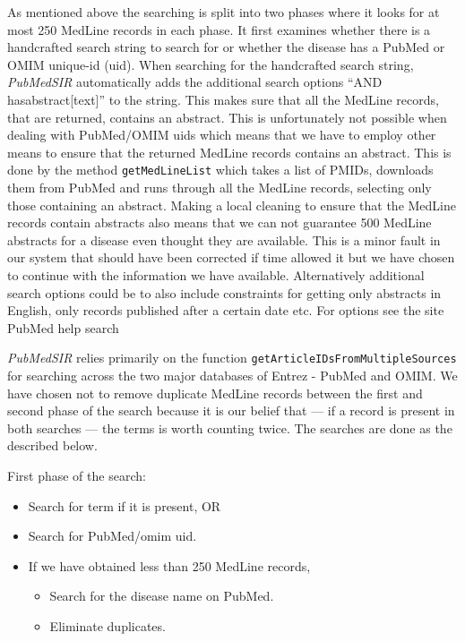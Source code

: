 As mentioned above the searching is split into two phases where it
looks for at most 250 MedLine records in each phase. It first examines
whether there is a handcrafted search string to search for or whether
the disease has a PubMed or OMIM unique-id (uid). When searching for
the handcrafted search string, \textit{PubMedSIR} automatically adds the
additional search options ``AND hasabstract[text]'' to the string. This
makes sure that all the MedLine records, that are returned, contains
an abstract. This is unfortunately not possible when dealing with
PubMed/OMIM uids which means that we have to employ other means to
ensure that the returned MedLine records contains an abstract. This is
done by the method \texttt{getMedLineList} which takes a list of
PMIDs, downloads them from PubMed and runs through all the MedLine
records, selecting only those containing an abstract. Making a local
cleaning to ensure that the MedLine records contain abstracts also
means that we can not guarantee 500 MedLine abstracts for a disease
even thought they are available. This is a minor fault in our system
that should have been corrected if time allowed it but we have chosen
to continue with the information we have available. Alternatively
additional search options could be to also include constraints for
getting only abstracts in English, only records published after a
certain date etc. For options see the site PubMed help search
\cite{PubMedHelpSearch}

\textit{PubMedSIR} relies primarily on the function
\texttt{getArticleIDsFromMultipleSources} for searching across the two
major databases of Entrez - PubMed and OMIM. We have chosen not to
remove duplicate MedLine records between the first and second phase of
the search because it is our belief that --- if a record is present in
both searches --- the terms is worth counting twice. The searches are
done as the described below.

First phase of the search:
\begin{itemize}

\item Search for term if it is present, OR

\item Search for PubMed/omim uid.

\item If we have obtained less than 250 MedLine records,
  
\begin{itemize}

  \item Search for the disease name on PubMed.

  \item Eliminate duplicates.

  \end{itemize}
\end{itemize}

